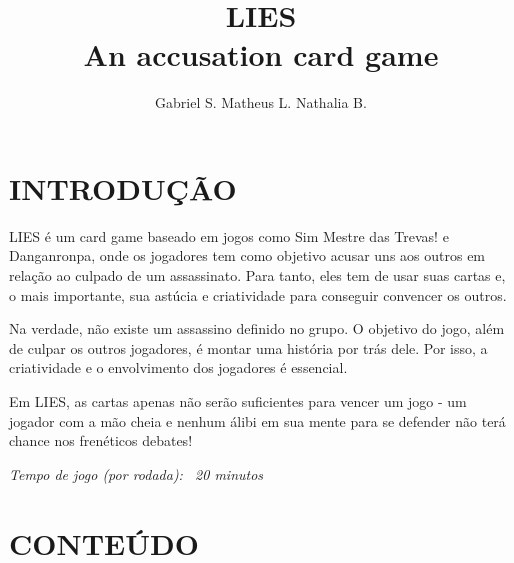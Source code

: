 \documentclass[a4paper, 11pt]{article}
\title{\textbf{LIES} \\ \small{An accusation card game}}
\author{Gabriel S. Matheus L. Nathalia B.}
\begin{document}
\maketitle

\newpage

\newpage

\section*{INTRODUÇÃO}


	
LIES é um card game baseado em jogos como Sim Mestre das Trevas! e Danganronpa, onde os jogadores tem como objetivo acusar uns aos outros em relação ao culpado de um assassinato. Para tanto, eles tem de usar suas cartas e, o mais importante, sua astúcia e criatividade para conseguir convencer os outros.

Na verdade, não existe um assassino definido no grupo. O objetivo do jogo, além de culpar os outros jogadores, é montar uma história por trás dele. Por isso, a criatividade e o envolvimento dos jogadores é essencial. 

Em LIES, as cartas apenas não serão suficientes para vencer um jogo - um jogador com a mão cheia e nenhum álibi em sua mente para se defender não terá chance nos frenéticos debates!

\textit{Tempo de jogo (por rodada): ~20 minutos}



\section*{CONTEÚDO}
\end{document}
